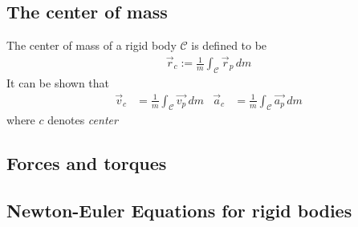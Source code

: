 \subsection{The center of mass} %

The center of mass of a rigid body \(\mathcal{C}\) is defined to be
\begin{align*}
    \vec{r}_c := \frac{1}{m}\int_{\mathcal{C}}\vec{r}_p\,dm
\end{align*}
It can be shown that
\begin{align*}
    \vec{v}_c &= \frac{1}{m}\int_{\mathcal{C}}\vec{v_p}\,dm  &
    \vec{a}_c &= \frac{1}{m}\int_{\mathcal{C}}\vec{a_p}\,dm
\end{align*}
where \(c\) denotes \textit{center}



\setcounter{section}{7}
\setcounter{subsection}{1}
\subsection{Forces and torques} %






\subsection{Newton-Euler Equations for rigid bodies} %



